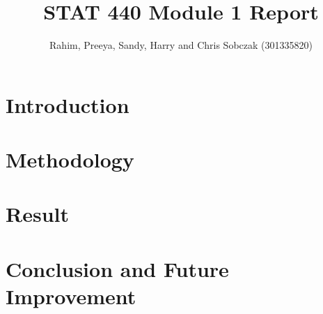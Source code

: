 \documentclass{article}
\author{Rahim, Preeya, Sandy, Harry and Chris Sobczak (301335820)}
\title{STAT 440 Module 1 Report}
\begin{document}
\maketitle

\section{Introduction}

\section{Methodology}

\section{Result}

\section{Conclusion and Future Improvement}

\printbibliography
\end{document}
